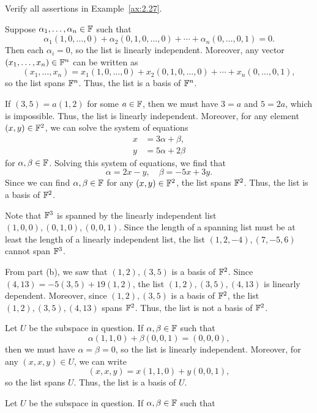 \begin{exc}
\begin{exercise}
Verify all assertions in Example~\ref{ax:2.27}.
\end{exercise}
\begin{solution}\leavevmode
\begin{parts}
\item Suppose $\alpha_1,\dots,\alpha_n\in\mathbb{F}$ such that
  \[ \alpha_1(1,0,\dots,0)+\alpha_2(0,1,0,\dots,0)+\cdots+\alpha_n(0,\dots,0,1)
     = 0. \]
  Then each $\alpha_i=0$, so the list is linearly independent. Moreover, any
  vector $(x_1,\dots,x_n)\in\mathbb{F}^n$ can be written as
  \[ (x_1,\dots,x_n) = x_1(1,0,\dots,0)+x_2(0,1,0,\dots,0)+\cdots
     +x_n(0,\dots,0,1), \]
  so the list spans $\mathbb{F}^n$. Thus, the list is a basis of $\mathbb{F}^n$.
\item If $(3,5)=a(1,2)$ for some $a\in\mathbb{F}$, then we must have $3=a$ and $5=2a$,
  which is impossible. Thus, the list is linearly independent. Moreover, for
  any element $(x,y)\in\mathbb{F}^2$, we can solve the system of equations
  \begin{align*}
  x &= 3\alpha+\beta,\\
  y &= 5\alpha+2\beta
  \end{align*}
  for $\alpha,\beta\in\mathbb{F}$. Solving this system of equations, we find that
  \[ \alpha=2x-y, \quad \beta=-5x+3y. \]
  Since we can find $\alpha,\beta\in\mathbb{F}$ for any $(x,y)\in\mathbb{F}^2$, the list spans
  $\mathbb{F}^2$. Thus, the list is a basis of $\mathbb{F}^2$.
\item Note that $\mathbb{F}^3$ is spanned by the linearly independent list
  $(1,0,0),\allowbreak(0,1,0),\allowbreak(0,0,1)$. Since the length of a spanning list must be at
  least the length of a linearly independent list, the list
  $(1,2,-4),(7,-5,6)$ cannot span $\mathbb{F}^3$.
\item From part (b), we saw that $(1,2),(3,5)$ is a basis of $\mathbb{F}^2$. Since
  $(4,13)=-5(3,5)+19(1,2)$, the list $(1,2),(3,5),(4,13)$ is linearly
  dependent. Moreover, since $(1,2),(3,5)$ is a basis of $\mathbb{F}^2$, the list
  $(1,2),(3,5),(4,13)$ spans $\mathbb{F}^2$. Thus, the list is not a basis of $\mathbb{F}^2$.
\item Let $U$ be the subspace in question. If $\alpha,\beta\in\mathbb{F}$ such that
  \[ \alpha(1,1,0)+\beta(0,0,1) = (0,0,0), \]
  then we must have $\alpha=\beta=0$, so the list is linearly independent.
  Moreover, for any $(x,x,y)\in U$, we can write
  \[ (x,x,y) = x(1,1,0)+y(0,0,1), \]
  so the list spans $U$. Thus, the list is a basis of $U$.
\item Let $U$ be the subspace in question. If $\alpha,\beta\in\mathbb{F}$ such that

\end{parts}
\end{solution}
\end{exc}
